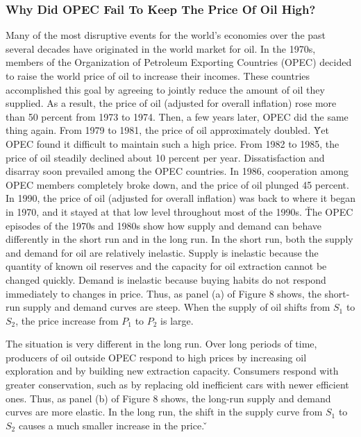 \subsubsection*{Why Did OPEC Fail To Keep The Price Of Oil High?}

Many of the most disruptive events for the world's economies over the past several decades have originated in the
world market for oil. In the 1970s, members of the Organization of Petroleum Exporting Countries (OPEC) decided to
raise the world price of oil to increase their incomes. These countries accomplished this goal by agreeing to jointly
reduce the amount of oil they supplied. As a result, the price of oil (adjusted for overall inflation) rose more than
50 percent from 1973 to 1974. Then, a few years later, OPEC did the same thing again. From 1979 to 1981, the price of
oil approximately doubled. \v

Yet OPEC found it difficult to maintain such a high price. From 1982 to 1985, the price of oil steadily declined
about 10 percent per year. Dissatisfaction and disarray soon prevailed among the OPEC countries. In 1986, cooperation
among OPEC members completely broke down, and the price of oil plunged 45 percent. In 1990, the price of oil
(adjusted for overall inflation) was back to where it began in 1970, and it stayed at that low level throughout most
of the 1990s. \v

The OPEC episodes of the 1970s and 1980s show how supply and demand can behave differently in the short run and in
the long run. In the short run, both the supply and demand for oil are relatively inelastic. Supply is inelastic
because the quantity of known oil reserves and the capacity for oil extraction cannot be changed quickly. Demand is
inelastic because buying habits do not respond immediately to changes in price. Thus, as panel (a) of Figure 8 shows,
the short-run supply and demand curves are steep. When the supply of oil shifts from $S_1$ to $S_2$, the price
increase from $P_1$ to $P_2$ is large.


The situation is very different in the long run. Over long periods of time, producers of oil outside OPEC respond to
high prices by increasing oil exploration and by building new extraction capacity. Consumers respond with greater
conservation, such as by replacing old inefficient cars with newer efficient ones. Thus, as panel (b) of Figure 8
shows, the long-run supply and demand curves are more elastic. In the long run, the shift in the supply curve from
$S_1$ to $S_2$ causes a much smaller increase in the price. \v

